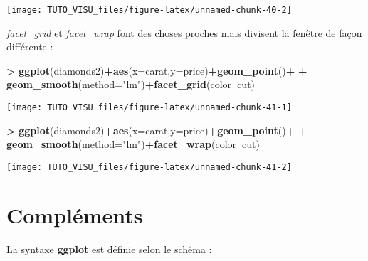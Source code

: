 \documentclass[]{book}
\newenvironment{Shaded}{\begin{snugshade}}{\end{snugshade}}
\newcommand{\DataTypeTok}[1]{\textcolor[rgb]{0.13,0.29,0.53}{#1}}
\newcommand{\KeywordTok}[1]{\textcolor[rgb]{0.13,0.29,0.53}{\textbf{#1}}}
\newcommand{\NormalTok}[1]{#1}
\newcommand{\OperatorTok}[1]{\textcolor[rgb]{0.81,0.36,0.00}{\textbf{#1}}}
\newcommand{\StringTok}[1]{\textcolor[rgb]{0.31,0.60,0.02}{#1}}
\theoremstyle{definition}
\theoremstyle{definition}
\theoremstyle{definition}
\theoremstyle{remark}
\begin{document}
\begin{center}\texttt{[image: TUTO\_VISU\_files/figure-latex/unnamed-chunk-40-2]} \end{center}

\emph{facet\_grid} et \emph{facet\_wrap} font des choses proches mais divisent la fenêtre de façon différente :

\begin{Shaded}
\begin{Highlighting}[]
\OperatorTok{>}\StringTok{ }\KeywordTok{ggplot}\NormalTok{(diamonds2)}\OperatorTok{+}\KeywordTok{aes}\NormalTok{(}\DataTypeTok{x=}\NormalTok{carat,}\DataTypeTok{y=}\NormalTok{price)}\OperatorTok{+}\KeywordTok{geom_point}\NormalTok{()}\OperatorTok{+}
\OperatorTok{+}\StringTok{   }\KeywordTok{geom_smooth}\NormalTok{(}\DataTypeTok{method=}\StringTok{"lm"}\NormalTok{)}\OperatorTok{+}\KeywordTok{facet_grid}\NormalTok{(color}\OperatorTok{~}\NormalTok{cut)}
\end{Highlighting}
\end{Shaded}

\begin{center}\texttt{[image: TUTO\_VISU\_files/figure-latex/unnamed-chunk-41-1]} \end{center}

\begin{Shaded}
\begin{Highlighting}[]
\OperatorTok{>}\StringTok{ }\KeywordTok{ggplot}\NormalTok{(diamonds2)}\OperatorTok{+}\KeywordTok{aes}\NormalTok{(}\DataTypeTok{x=}\NormalTok{carat,}\DataTypeTok{y=}\NormalTok{price)}\OperatorTok{+}\KeywordTok{geom_point}\NormalTok{()}\OperatorTok{+}
\OperatorTok{+}\StringTok{   }\KeywordTok{geom_smooth}\NormalTok{(}\DataTypeTok{method=}\StringTok{"lm"}\NormalTok{)}\OperatorTok{+}\KeywordTok{facet_wrap}\NormalTok{(color}\OperatorTok{~}\NormalTok{cut)}
\end{Highlighting}
\end{Shaded}

\begin{center}\texttt{[image: TUTO\_VISU\_files/figure-latex/unnamed-chunk-41-2]} \end{center}

\hypertarget{compluxe9ments}{%
\section{Compléments}\label{compluxe9ments}}

La syntaxe \textbf{ggplot} est définie selon le schéma :
\end{document}
